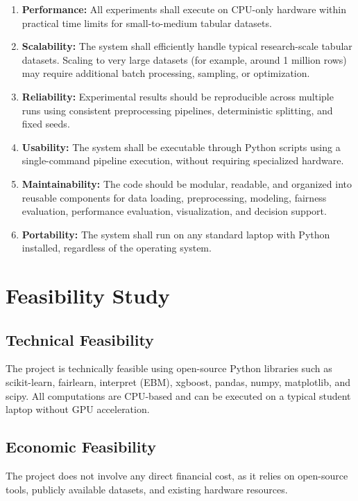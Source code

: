 \begin{enumerate}
    \item[NFR1.] \textbf{Performance:} All experiments shall execute on CPU-only hardware within practical time limits for small-to-medium tabular datasets.

    \item[NFR2.] \textbf{Scalability:} The system shall efficiently handle typical research-scale tabular datasets. Scaling to very large datasets (for example, around 1 million rows) may require additional batch processing, sampling, or optimization.

    \item[NFR3.] \textbf{Reliability:} Experimental results should be reproducible across multiple runs using consistent preprocessing pipelines, deterministic splitting, and fixed seeds.

    \item[NFR4.] \textbf{Usability:} The system shall be executable through Python scripts using a single-command pipeline execution, without requiring specialized hardware.

    \item[NFR5.] \textbf{Maintainability:} The code should be modular, readable, and organized into reusable components for data loading, preprocessing, modeling, fairness evaluation, performance evaluation, visualization, and decision support.

    \item[NFR6.] \textbf{Portability:} The system shall run on any standard laptop with Python installed, regardless of the operating system.
\end{enumerate}


\section{Feasibility Study}

\subsection{Technical Feasibility}
The project is technically feasible using open-source Python libraries such as scikit-learn, fairlearn, interpret (EBM), xgboost, pandas, numpy, matplotlib, and scipy. All computations are CPU-based and can be executed on a typical student laptop without GPU acceleration.

\subsection{Economic Feasibility}
The project does not involve any direct financial cost, as it relies on open-source tools, publicly available datasets, and existing hardware resources.

